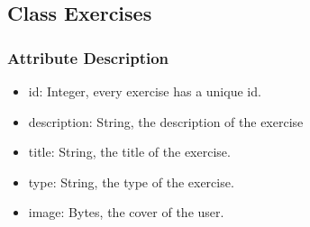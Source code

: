 \documentclass[16pt]{scrreprt}
\begin{document}
\subsection{Class Exercises}
\subsubsection{Attribute Description}
\begin{itemize}
	\item id: Integer, every exercise has a unique id.
	\item description: String, the description of the exercise
	\item title: String, the title of the exercise.
	\item type: String, the type of the exercise.
	\item image: Bytes, the cover of the user.
\end{itemize}
\end{document}
